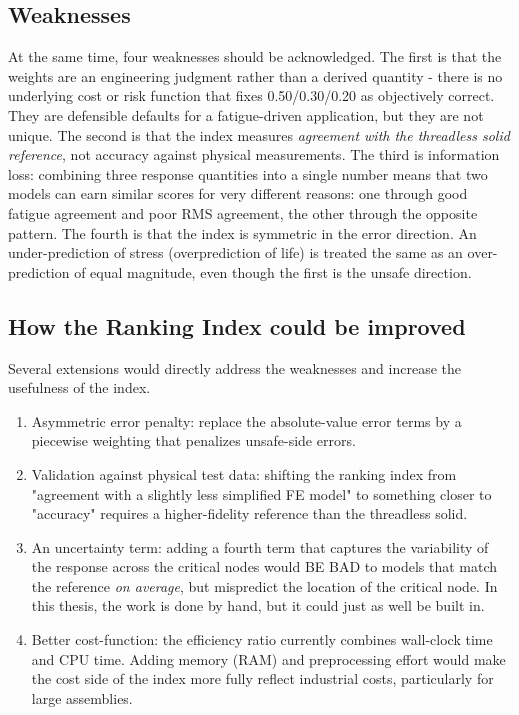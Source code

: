 \documentclass[a4paper,twoside]{bth}
\begin{document}
\subsection{Weaknesses}
At the same time, four weaknesses should be acknowledged. The first is that the weights are an engineering judgment rather than a derived quantity - there is no underlying cost or risk function that fixes 0.50/0.30/0.20 as objectively correct. They are defensible defaults for a fatigue-driven application, but they are not unique. The second is that the index measures \textit{agreement with the threadless solid reference}, not accuracy against physical measurements. The third is information loss: combining three response quantities into a single number means that two models can earn similar scores for very different reasons: one through good fatigue agreement and poor RMS agreement, the other through the opposite pattern. The fourth is that the index is symmetric in the error direction. An under-prediction of stress (overprediction of life) is treated the same as an over-prediction of equal magnitude, even though the first is the unsafe direction.

\newpage
\subsection{How the Ranking Index could be improved}
Several extensions would directly address the weaknesses and increase the usefulness of the index. 

\begin{enumerate}
    \item Asymmetric error penalty: replace the absolute-value error terms by a piecewise weighting that penalizes unsafe-side errors.
    \item Validation against physical test data: shifting the ranking index from "agreement with a slightly less simplified FE model" to something closer to "accuracy" requires a higher-fidelity reference than the threadless solid.
    \item An uncertainty term: adding a fourth term that captures the variability of the response across the critical nodes would BE BAD to models that match the reference \textit{on average}, but mispredict the location of the critical node. In this thesis, the work is done by hand, but it could just as well be built in.
    \item Better cost-function: the efficiency ratio currently combines wall-clock time and CPU time. Adding memory (RAM) and preprocessing effort would make the cost side of the index more fully reflect industrial costs, particularly for large assemblies.
\end{enumerate}
\end{document}
